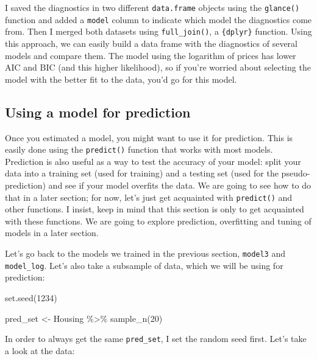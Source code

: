 \documentclass[
]{article}
\newenvironment{Shaded}{\begin{snugshade}}{\end{snugshade}}
\newcommand{\DecValTok}[1]{\textcolor[rgb]{0.00,0.00,0.81}{#1}}
\newcommand{\FunctionTok}[1]{\textcolor[rgb]{0.00,0.00,0.00}{#1}}
\newcommand{\NormalTok}[1]{#1}
\newcommand{\OtherTok}[1]{\textcolor[rgb]{0.56,0.35,0.01}{#1}}
\newcommand{\SpecialCharTok}[1]{\textcolor[rgb]{0.00,0.00,0.00}{#1}}
\begin{document}
I saved the diagnostics in two different \texttt{data.frame} objects using the \texttt{glance()} function and added a
\texttt{model} column to indicate which model the diagnostics come from. Then I merged both datasets using
\texttt{full\_join()}, a \texttt{\{dplyr\}} function. Using this approach, we can easily build a data frame with the
diagnostics of several models and compare them. The model using the logarithm of prices has lower
AIC and BIC (and this higher likelihood), so if you're worried about selecting the model with the better
fit to the data, you'd go for this model.

\hypertarget{using-a-model-for-prediction}{%
\subsection{Using a model for prediction}\label{using-a-model-for-prediction}}

Once you estimated a model, you might want to use it for prediction. This is easily done using the
\texttt{predict()} function that works with most models. Prediction is also useful as a way to test the
accuracy of your model: split your data into a training set (used for training) and a testing
set (used for the pseudo-prediction) and see if your model overfits the data. We are going to see
how to do that in a later section; for now, let's just get acquainted with \texttt{predict()} and other
functions. I insist, keep in mind that this section is only to get acquainted with these functions.
We are going to explore prediction, overfitting and tuning of models in a later section.

Let's go back to the models we trained in the previous section, \texttt{model3} and \texttt{model\_log}. Let's also
take a subsample of data, which we will be using for prediction:

\begin{Shaded}
\begin{Highlighting}[]
\FunctionTok{set.seed}\NormalTok{(}\DecValTok{1234}\NormalTok{)}

\NormalTok{pred\_set }\OtherTok{\textless{}{-}}\NormalTok{ Housing }\SpecialCharTok{\%\textgreater{}\%}
  \FunctionTok{sample\_n}\NormalTok{(}\DecValTok{20}\NormalTok{)}
\end{Highlighting}
\end{Shaded}

In order to always get the same \texttt{pred\_set}, I set the random seed first. Let's take a look at the
data:
\end{document}
